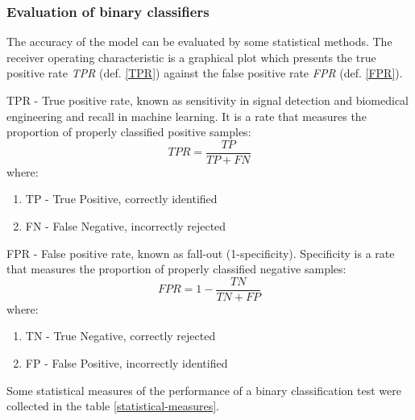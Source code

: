 \subsubsection{Evaluation of binary classifiers}
 The accuracy of the model can be evaluated by some statistical methods.
  The receiver operating characteristic is a graphical plot which presents the true positive rate \textit{TPR} (def. \ref{TPR}) against the false positive rate \textit{FPR} (def. \ref{FPR}).
  
  \begin{definition}[TPR]
  	\label{TPR}
  	TPR - True positive rate, known as sensitivity in signal detection and biomedical engineering and recall in machine learning. It is a rate that measures the proportion of properly classified positive samples:
  	\[TPR=\frac{TP}{TP+FN}\]
  	where:
\begin{enumerate}
  		\item TP - True Positive, correctly identified
  		\item FN - False Negative, incorrectly rejected
\end{enumerate}
  \end{definition}
  \begin{definition}[FPR]
  	\label{FPR}
  	FPR - False positive rate, known as fall-out (1-specificity). Specificity is a rate that measures the proportion of properly classified negative samples:
  	\[FPR=1-\frac{TN}{TN+FP}\]
  	where:
\begin{enumerate}
  		\item TN - True Negative, correctly rejected
  		\item FP - False Positive, incorrectly identified
\end{enumerate}
  	
  \end{definition}
  
 Some statistical measures of the performance of a binary classification test were collected in the table \ref{statistical-measures}.

